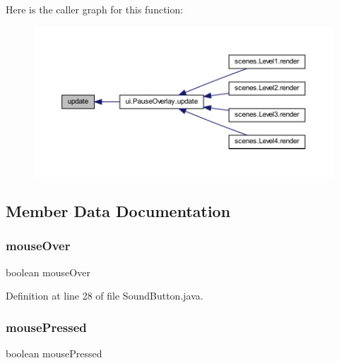 Here is the caller graph for this function\+:\nopagebreak
\begin{figure}[H]
\begin{center}
\leavevmode
\includegraphics[width=350pt]{classui_1_1_sound_button_ac5c54df7ed3b930268c8d7752c101725_icgraph}
\end{center}
\end{figure}


\subsection{Member Data Documentation}
\mbox{\label{classui_1_1_sound_button_a9659ce063fb98f78eefb2ee148d1e9fc}} 
\subsubsection{\texorpdfstring{mouse\+Over}{mouseOver}}
{\footnotesize\ttfamily boolean mouse\+Over\hspace{0.3cm}{\ttfamily [private]}}



Definition at line 28 of file Sound\+Button.\+java.

\mbox{\label{classui_1_1_sound_button_aab61081d8be401bc3a4081ae11fb50d9}} 
\subsubsection{\texorpdfstring{mouse\+Pressed}{mousePressed}}
{\footnotesize\ttfamily boolean mouse\+Pressed\hspace{0.3cm}{\ttfamily [private]}}



